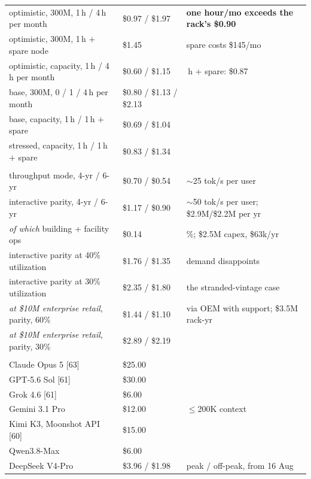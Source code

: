 \begin{table}[htbp]
\begin{tabular}{>{\raggedright\arraybackslash}p{66mm}>{\raggedleft\arraybackslash}p{28mm}>{\raggedright\arraybackslash}p{50mm}}
    \quad optimistic, 300M, 1\,h / 4\,h per month & \$0.97 / \$1.97 & \textbf{one hour/mo exceeds the rack's \$0.90} \\
    \quad optimistic, 300M, 1\,h $+$ spare node & \$1.45 & spare costs \$145/mo \\
    \quad optimistic, capacity, 1\,h / 4\,h per month & \$0.60 / \$1.15 & 1\,h $+$ spare: \$0.87 \\
    \quad base, 300M, 0 / 1 / 4\,h per month & \$0.80 / \$1.13 / \$2.13 & \\
    \quad base, capacity, 1\,h / 1\,h $+$ spare & \$0.69 / \$1.04 & \\
    \quad stressed, capacity, 1\,h / 1\,h $+$ spare & \$0.83 / \$1.34 & \\
    \midrule
    \multicolumn{3}{>{\raggedright\arraybackslash}p{150mm}}{\emph{Rubin VR200 NVL72, Kimi K3, operator's fully loaded cost, 60\% utilization}} \\
    \quad throughput mode, 4-yr / 6-yr & \$0.70 / \$0.54 & $\sim$25 tok/s per user \\
    \quad interactive parity, 4-yr / 6-yr & \$1.17 / \$0.90 & $\sim$50 tok/s per user; \$2.9M/\$2.2M per yr \\
    \quad \emph{of which} building + facility ops & \$0.14 & 12\%; \$2.5M capex, \$63k/yr \\
    \quad interactive parity at 40\% utilization & \$1.76 / \$1.35 & demand disappoints \\
    \quad interactive parity at 30\% utilization & \$2.35 / \$1.80 & the stranded-vintage case \\
    \quad \emph{at \$10M enterprise retail}, parity, 60\% & \$1.44 / \$1.10 & via OEM with support; \$3.5M rack-yr \\
    \quad \emph{at \$10M enterprise retail}, parity, 30\% & \$2.89 / \$2.19 & \\
    \midrule
    \multicolumn{3}{>{\raggedright\arraybackslash}p{150mm}}{\emph{API list price, output tokens}} \\
    \quad Claude Opus 5 [63] & \$25.00 & \\
    \quad GPT-5.6 Sol [61] & \$30.00 & \\
    \quad Grok 4.6 [61] & \$6.00 & \\
    \quad Gemini 3.1 Pro & \$12.00 & $\le$200K context \\
    \quad Kimi K3, Moonshot API [60] & \$15.00 & \\
    \quad Qwen3.8-Max & \$6.00 & \\
    \quad DeepSeek V4-Pro & \$3.96 / \$1.98 & peak / off-peak, from 16 Aug \\
    \bottomrule
  \end{tabular}
\end{table}

